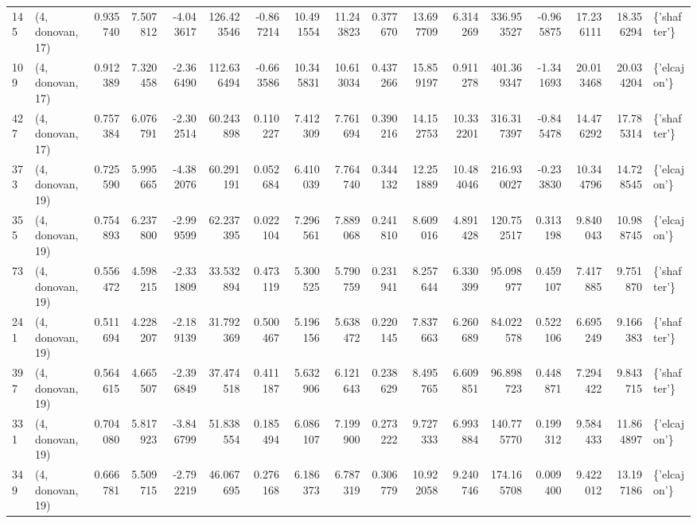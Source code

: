 \begin{tabular}{llrrrrrrrrrrrrrrl}
145 &  (4, donovan, 17) &   0.935740 &   7.507812 &  -4.043617 &   126.423546 &  -0.867214 &  10.491554 &  11.243823 &  0.377670 &  13.697709 &   6.314269 &   336.953527 &  -0.965875 &  17.236111 &  18.356294 &  \{'shafter'\} \\
109 &  (4, donovan, 17) &   0.912389 &   7.320458 &  -2.366490 &   112.636494 &  -0.663586 &  10.345831 &  10.613034 &  0.437266 &  15.859197 &   0.911278 &   401.369347 &  -1.341693 &  20.013468 &  20.034204 &  \{'elcajon'\} \\
427 &  (4, donovan, 17) &   0.757384 &   6.076791 &  -2.302514 &    60.243898 &   0.110227 &   7.412309 &   7.761694 &  0.390216 &  14.152753 &  10.332201 &   316.317397 &  -0.845478 &  14.476292 &  17.785314 &  \{'shafter'\} \\
373 &  (4, donovan, 19) &   0.725590 &   5.995665 &  -4.382076 &    60.291191 &   0.052684 &   6.410039 &   7.764740 &  0.344132 &  12.251889 &  10.484046 &   216.930027 &  -0.233830 &  10.344796 &  14.728545 &  \{'elcajon'\} \\
355 &  (4, donovan, 19) &   0.754893 &   6.237800 &  -2.999599 &    62.237395 &   0.022104 &   7.296561 &   7.889068 &  0.241810 &   8.609016 &   4.891428 &   120.752517 &   0.313198 &   9.840043 &  10.988745 &  \{'elcajon'\} \\
73  &  (4, donovan, 19) &   0.556472 &   4.598215 &  -2.331809 &    33.532894 &   0.473119 &   5.300525 &   5.790759 &  0.231941 &   8.257644 &   6.330399 &    95.098977 &   0.459107 &   7.417885 &   9.751870 &  \{'shafter'\} \\
241 &  (4, donovan, 19) &   0.511694 &   4.228207 &  -2.189139 &    31.792369 &   0.500467 &   5.196156 &   5.638472 &  0.220145 &   7.837663 &   6.260689 &    84.022578 &   0.522106 &   6.695249 &   9.166383 &  \{'shafter'\} \\
397 &  (4, donovan, 19) &   0.564615 &   4.665507 &  -2.396849 &    37.474518 &   0.411187 &   5.632906 &   6.121643 &  0.238629 &   8.495765 &   6.609851 &    96.898723 &   0.448871 &   7.294422 &   9.843715 &  \{'shafter'\} \\
331 &  (4, donovan, 19) &   0.704080 &   5.817923 &  -3.846799 &    51.838554 &   0.185494 &   6.086107 &   7.199900 &  0.273222 &   9.727333 &   6.993884 &   140.775770 &   0.199312 &   9.584433 &  11.864897 &  \{'elcajon'\} \\
349 &  (4, donovan, 19) &   0.666781 &   5.509715 &  -2.792219 &    46.067695 &   0.276168 &   6.186373 &   6.787319 &  0.306779 &  10.922058 &   9.240746 &   174.165708 &   0.009400 &   9.422012 &  13.197186 &  \{'elcajon'\} \\

\end{tabular}
